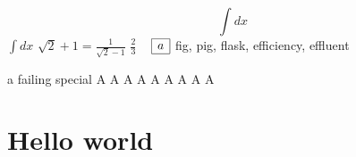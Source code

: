 \documentclass{article}
\begin{document}
\begin{equation}
  \int dx 
\end{equation}
\newpage
$\int dx$
\newpage
$\sqrt2+1=\frac1{\sqrt2-1}$
\newpage
$\frac23$
\newpage
\ 
\newpage
\( \begin{array}{|r|} \hline a \cr \hline \end{array} \)
\newpage
fig, pig, flask, efficiency, effluent
\newpage
{}a failing special
\newpage
\Huge A \LARGE A \Large A \large A \normalsize A \small A
\footnotesize A \scriptsize A \tiny A
\newpage
\color{yellow}

\section*{Hello world}
\pagecolor{blue}
\end{document}
